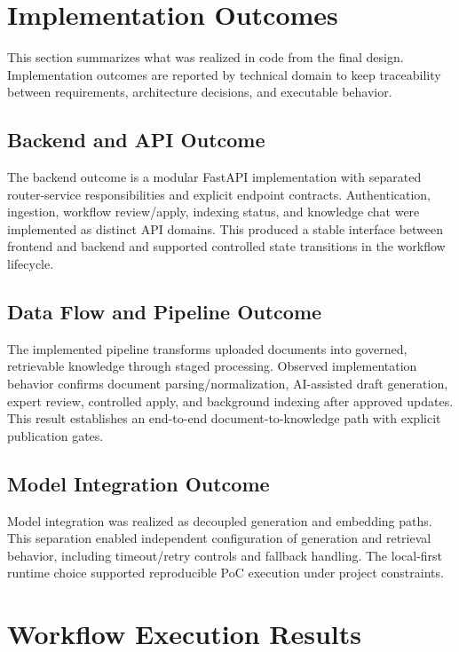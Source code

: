 \section{Implementation Outcomes}

This section summarizes what was realized in code from the final design.
Implementation outcomes are reported by technical domain to keep traceability between requirements, architecture decisions, and executable behavior.

\subsection{Backend and API Outcome}

The backend outcome is a modular FastAPI implementation with separated router-service responsibilities and explicit endpoint contracts.
Authentication, ingestion, workflow review/apply, indexing status, and knowledge chat were implemented as distinct API domains.
This produced a stable interface between frontend and backend and supported controlled state transitions in the workflow lifecycle.

\subsection{Data Flow and Pipeline Outcome}

The implemented pipeline transforms uploaded documents into governed, retrievable knowledge through staged processing.
Observed implementation behavior confirms document parsing/normalization, AI-assisted draft generation, expert review, controlled apply, and background indexing after approved updates.
This result establishes an end-to-end document-to-knowledge path with explicit publication gates.

\subsection{Model Integration Outcome}

Model integration was realized as decoupled generation and embedding paths.
This separation enabled independent configuration of generation and retrieval behavior, including timeout/retry controls and fallback handling.
The local-first runtime choice supported reproducible PoC execution under project constraints.

\section{Workflow Execution Results}

